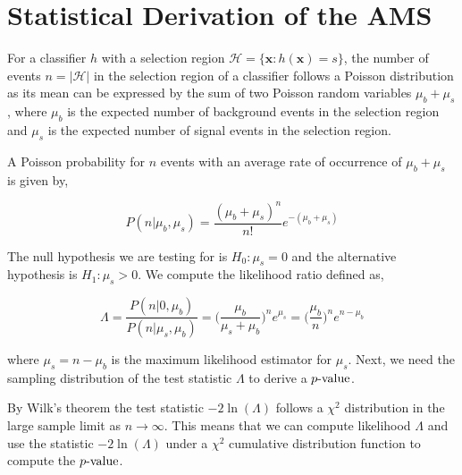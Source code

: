 \documentclass[a4paper,twoside]{report}
\newcommand{\pvalue}{\mathop{p{\textnormal{-value}}}}
\begin{document}
\chapter{Statistical Derivation of the AMS}
\label{statams}

For a classifier $h$ with a selection region $\mathcal{H} = \{\mathbf{x}: h(\mathbf{x}) = s\}$, the number of events $n = |\mathcal{H}|$ in the selection region of a classifier follows a Poisson distribution as its mean can be expressed by the sum of two Poisson random variables $\mu_b + \mu_s$, where $\mu_b$  is the expected number of background events in the selection region and $\mu_s$ is the expected number of signal events in the selection region. 

A Poisson probability for $n$ events with an average rate of occurrence of $\mu_{b} + \mu_{s}$ is given by,

\begin{equation}
P(n \vert \mu_{b},\mu_{s}) = \frac{(\mu_{b} + \mu_{s})^{n}}{n!}e^{-(\mu_{b} + \mu_{s})}
\end{equation}


The null hypothesis we are testing for is $H_{0}: \mu_{s} = 0$ and the alternative hypothesis is $H_{1}: \mu_{s} > 0$. We compute the likelihood ratio defined as, 

\begin{equation}
\Lambda = \frac{P(n \vert 0,\mu_{b})}{P(n \vert \mu_{s},\mu_{b})} = \Big( \frac{\mu_{b}}{\mu_{s} + \mu_{b}}\Big)^{n}e^{\mu_s} = \Big( \frac{\mu_{b}}{n}\Big)^{n}e^{n - \mu_{b}}
\end{equation}

where $\mu_s = n - \mu_b$ is the maximum likelihood estimator for $\mu_s$. Next, we need the sampling distribution of the test statistic $\Lambda$ to derive a $\pvalue$. 

By Wilk's theorem the test statistic $-2\ln(\Lambda)$ follows a $\chi^{2}$ distribution in the large sample limit as $n \rightarrow \infty$. This means that we can compute likelihood $\Lambda$ and use the statistic $-2\ln(\Lambda)$ under a $\chi^{2}$ cumulative distribution function to compute the $\pvalue$. 
\end{document}
